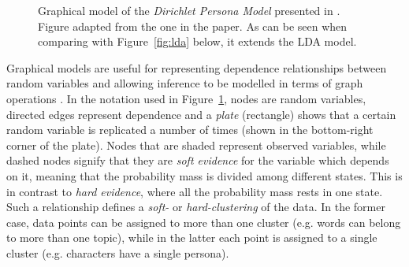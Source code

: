 \documentclass[bsc,frontabs,singlespacing,parskip, twoside]{infthesis}
\begin{document}
\begin{figure}[ht!]
\centering
{}
\caption{Graphical model of the \textit{Dirichlet Persona Model} presented in \cite{Bamman2013}. Figure adapted from the one in the paper. As can be seen when comparing with Figure~\ref{fig:lda} below, it extends the LDA model.}
\label{fig:dirichlet_persona}
\end{figure}

Graphical models are useful for representing dependence relationships between random variables and allowing inference to be modelled in terms of graph operations \cite{barber2012bayesian}. In the notation used in Figure~\ref{fig:dirichlet_persona}, nodes are random variables, directed edges represent dependence and a \textit{plate} (rectangle) shows that a certain random variable is replicated a number of times (shown in the bottom-right corner of the plate). Nodes that are shaded represent observed variables, while dashed nodes signify that they are \textit{soft evidence} for the variable which depends on it, meaning that the probability mass is divided among different states. This is in contrast to \textit{hard evidence}, where all the probability mass rests in one state. Such a relationship defines a \textit{soft-} or \textit{hard-clustering} of the data. In the former case, data points can be assigned to more than one cluster (e.g. words can belong to more than one topic), while in the latter each point is assigned to a single cluster (e.g. characters have a single persona).
\end{document}
